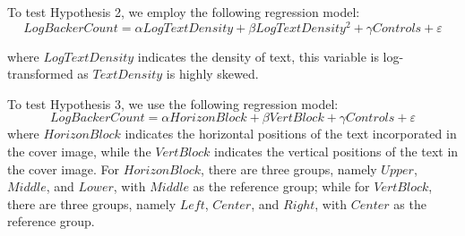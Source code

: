 \documentclass[a4paper]{article}
\begin{document}
To test Hypothesis 2, we employ the following regression model:
\begin{equation}
    LogBackerCount = \alpha LogTextDensity + \beta LogTextDensity^2 + \gamma Controls + \varepsilon 
\end{equation}

where $LogTextDensity$ indicates the density of text, this variable is log-transformed as $TextDensity$ is highly skewed.

To test Hypothesis 3, we use the following regression model:
\begin{equation}
    LogBackerCount = \alpha HorizonBlock +\beta VertBlock +  \gamma Controls + \varepsilon 
\end{equation}
where $HorizonBlock$ indicates the horizontal positions of the text incorporated in the cover image, while the $VertBlock$ indicates the vertical positions of the text in the cover image. For $HorizonBlock$, there are three groups, namely $Upper$, $Middle$, and $Lower$, with $Middle$ as the reference group; while for $VertBlock$, there are three groups, namely $Left$, $Center$, and $Right$, with $Center$ as the reference group. 
\end{document}
